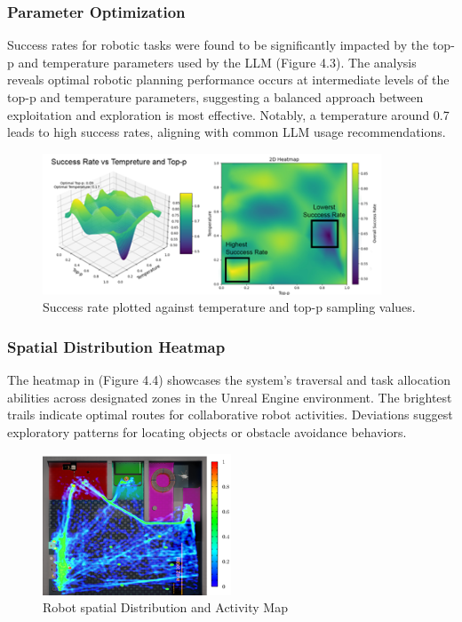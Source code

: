 \documentclass[pdflatex,sn-mathphys-num]{sn-jnl}%
\theoremstyle{thmstyleone}%
\theoremstyle{thmstyletwo}%
\theoremstyle{thmstylethree}%
\begin{document}
\subsubsection{Parameter Optimization}
Success rates for robotic tasks were found to be significantly impacted by the top-p and temperature parameters used by the LLM (Figure 4.3).
The analysis reveals optimal robotic planning performance occurs at intermediate levels of the top-p and temperature parameters, suggesting a balanced approach between exploitation and exploration is most effective. Notably, a temperature around 0.7 leads to high success rates, aligning with common LLM usage recommendations.
\begin{figure}[H]
\centering
\includegraphics[width=0.9\textwidth]{figures/Picture1.png}
\caption{Success rate plotted against temperature and top-p sampling values.}\label{fig11}
\end{figure}
\subsubsection{Spatial Distribution Heatmap}
The heatmap in (Figure 4.4) showcases the system's traversal and task allocation abilities across designated zones in the Unreal Engine environment.
The brightest trails indicate optimal routes for collaborative robot activities. Deviations suggest exploratory patterns for locating objects or obstacle avoidance behaviors.
\begin{figure}[H]
\centering
\includegraphics[width=0.5\textwidth]{figures/heatmap.png}
\caption{ Robot spatial Distribution and Activity Map}\label{fig11}
\end{figure}
\end{document}
